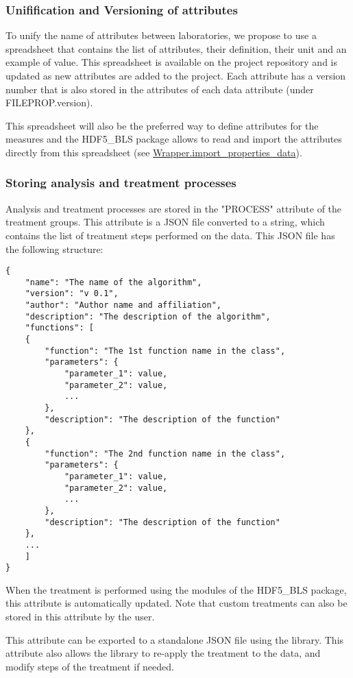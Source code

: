\subsubsection*{Unifification and Versioning of attributes}
    To unify the name of attributes between laboratories, we propose to use a spreadsheet that contains the list of attributes, their definition, their unit and an example of value. This spreadsheet is available on the project repository and is updated as new attributes are added to the project. Each attribute has a version number that is also stored in the attributes of each data attribute (under FILEPROP.version).

    This spreadsheet will also be the preferred way to define attributes for the measures and the HDF5\_BLS package allows to read and import the attributes directly from this spreadsheet (see \hyperref[subsec:wrapper.import_properties_data]{Wrapper.import\_properties\_data}).
    
\subsubsection*{Storing analysis and treatment processes}

    Analysis and treatment processes are stored in the "PROCESS" attribute of the treatment groups. This attribute is a JSON file converted to a string, which contains the list of treatment steps performed on the data. This JSON file has the following structure:
    \begin{verbatim}
{
    "name": "The name of the algorithm",
    "version": "v 0.1",
    "author": "Author name and affiliation",
    "description": "The description of the algorithm",
    "functions": [
    {
        "function": "The 1st function name in the class",
        "parameters": {
            "parameter_1": value,
            "parameter_2": value,
            ...
        },
        "description": "The description of the function"
    },
    {
        "function": "The 2nd function name in the class",
        "parameters": {
            "parameter_1": value,
            "parameter_2": value,
            ...
        },
        "description": "The description of the function"
    },
    ...
    ]
}
    \end{verbatim}

    When the treatment is performed using the modules of the HDF5\_BLS package, this attribute is automatically updated. Note that custom treatments can also be stored in this attribute by the user.

    This attribute can be exported to a standalone JSON file using the library. This attribute also allows the library to re-apply the treatment to the data, and modify steps of the treatment if needed.
    